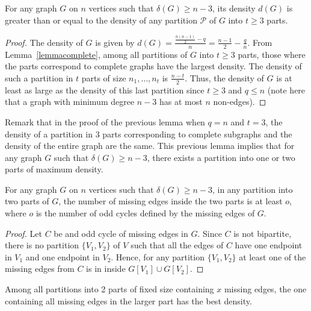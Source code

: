 \documentclass[a4paper,USenglish,cleveref, autoref]{lipics-v2021}
\begin{document}
 \begin{lemma}\label{threesets}
For any graph $G$ on $n$ vertices such that $\delta(G) \geq n-3$, its density $d(G)$ is greater than or equal to the density of any partition $\mathcal{P}$ of $G$ into $t\geq 3$ parts.
 \end{lemma}
 \begin{proof} 
 The density of $G$ is given by  $d(G)= \frac{\frac{n(n-1)}{2}-q}{n}=\frac{n-1}{2} - \frac{q}{n}$. From Lemma~\ref{lemmacomplete}, among all partitions of $G$ into $t\geq 3$ parts, those where the parts correspond to complete graphs have the largest density.  The density of such a partition in $t$ parts of size $n_1,\ldots,n_t$ is $\frac{n-t}{2}$.  Thus, the density of $G$ is at least as large as the density of this last partition since $t\geq 3$ and $q\leq n$ (note here that a graph with minimum degree $n-3$ has at most $n$ non-edges).
 \end{proof}
 
 
 
Remark that in the proof of the previous lemma when $q=n$ and $t=3$, the density of a partition in 3 parts corresponding to complete subgraphs and the density of the entire graph are the same.    This previous lemma implies that for any graph $G$  such that $\delta(G) \geq n-3$, there exists a partition into one or two parts of maximum density.


 

\begin{lemma}\label{odd}
For any graph $G$ on $n$ vertices such that $\delta(G) \geq n-3$, in any partition into two parts of $G$, the number of missing edges  inside the two parts is at least $o$, where $o$ is the number of odd cycles defined by the missing edges of $G$.
\end{lemma}

\begin{proof}
Let $C$ be and odd cycle of missing edges in $G$. Since $C$ is not bipartite, there is no partition $\{V_1,V_2\}$ of $V$ such that all the edges of $C$ have one endpoint in $V_1$ and one endpoint in $V_2$. Hence, for any partition $\{V_1,V_2\}$ at least one of the missing edges from $C$ is in inside $G[V_1]\cup G[V_2]$. 
\end{proof} 
 
 \begin{lemma}\label{part1}
 Among all partitions into 2 parts of fixed size containing $x$ missing edges, the one containing all missing edges in the larger part has the best density. 
 \end{lemma}
\end{document}
